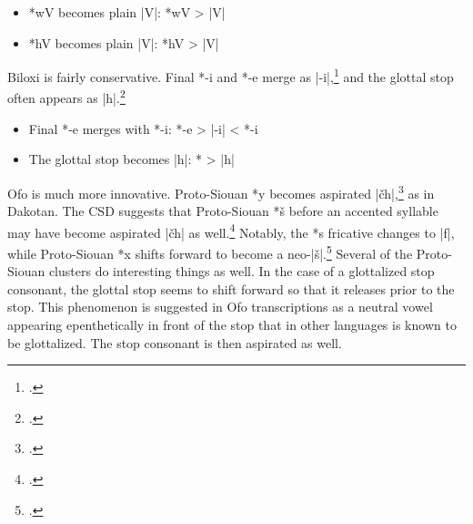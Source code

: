 \documentclass[output=paper]{LSP/langsci}
\begin{document}
\begin{itemize}
\item *wV becomes plain |V|: \hspace{1em} *wV	>	|V|
\item *hV becomes plain |V|: \hspace{1em} *hV	>	|V|
\end{itemize}


Biloxi is fairly conservative.  Final *-i and *-e merge as |-i|,\footnote{\citealt[901]{Rankinetal2006PDF}.}  and the glottal stop often appears as |h|.\footnote{\citealt[103]{Rankinetal2006PDF}.} 

\begin{itemize}
\item Final *-e merges with *-i: \hspace{2.1em} *-e	>	|-i|	<	*-i
\item The glottal stop becomes |h|: \hspace{1em} *\textsuperscript{}	>	|h|
\end{itemize}


Ofo is much more innovative.  Proto-Siouan *y becomes aspirated |\v{c}h|,\footnote{\citealt[85, 242]{Rankinetal2006PDF}.} as in Dakotan.  The CSD suggests that Proto-Siouan *š before an accented syllable may have become aspirated |\v{c}h| as well.\footnote{\citealt[827]{Rankinetal2006PDF}.} Notably, the *s fricative changes to |f|, while Proto-Siouan *x shifts forward to become a neo-|š|.\footnote{\citealt[174, 299]{Rankinetal2006PDF}.} Several of the Proto-Siouan clusters do interesting things as well.  In the case of a glottalized stop consonant, the glottal stop seems to shift forward so that it releases prior to the stop.  This phenomenon is suggested in Ofo transcriptions as a neutral vowel appearing epenthetically in front of the stop that in other languages is known to be glottalized.  The stop consonant is then aspirated as well.
\end{document}
